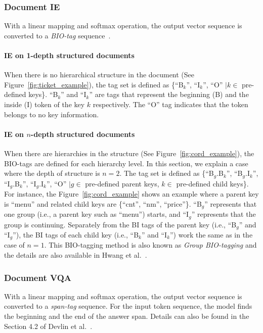 \documentclass[runningheads]{llncs}
\begin{document}
\subsubsection{Document IE}
With a linear mapping and softmax operation, the output vector sequence is converted to a \textit{BIO-tag} sequence~\cite{hwang2019pot}.

\paragraph{IE on 1-depth structured documents}
When there is no hierarchical structure in the document (See Figure~\ref{fig:ticket_example}), the tag set is defined as \{``B$_{k}$'', ``I$_{k}$'', ``O''  $\mid k\in$ pre-defined keys\}.
``B$_{k}$'' and ``I$_{k}$'' are tags that represent the beginning (B) and the inside (I) token of the key $k$ respectively.
The ``O'' tag indicates that the token belongs to no key information. 

\paragraph{IE on $n$-depth structured documents}
When there are hierarchies in the structure (See Figure~\ref{fig:cord_example}), the BIO-tags are defined for each hierarchy level.
In this section, we explain a case where the depth of structure is $n=2$.
The tag set is defined as \{``B$_{g}$.B$_{k}$'', ``B$_{g}$.I$_{k}$'', ``I$_{g}$.B$_{k}$'', ``I$_{g}$.I$_{k}$'', ``O''  $\mid g\in$ pre-defined parent keys, $k\in$ pre-defined child keys\}.
For instance, the Figure~\ref{fig:cord_example} shows an example where a parent key is ``menu'' and related child keys are \{``cnt'', ``nm'', ``price''\}.
``B$_{g}$'' represents that one group (i.e., a parent key such as ``menu'') starts, and ``I$_{g}$'' represents that the group is continuing. 
Separately from the BI tags of the parent key (i.e., ``B$_{g}$'' and ``I$_{g}$''), the BI tags of each child key (i.e., ``B$_{k}$'' and ``I$_{k}$'') work the same as in the case of $n=1$.
This BIO-tagging method is also known as \textit{Group BIO-tagging} and the details are also available in Hwang et al.~\cite{hwang2019pot}.

\subsubsection{Document VQA}
With a linear mapping and softmax operation, the output vector sequence is converted to a \textit{span-tag} sequence.
For the input token sequence, the model finds the beginning and the end of the answer span.
Details can also be found in the Section 4.2 of Devlin et al.~\cite{devlinBERT2018}.
\end{document}
